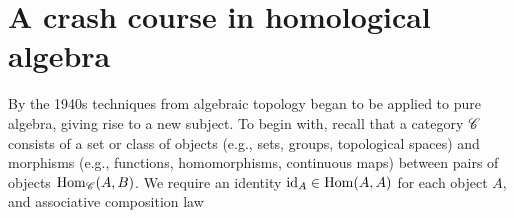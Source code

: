 \section{A crash course in homological algebra}
By the 1940s techniques from algebraic topology began to be applied to pure
algebra, giving rise to a new subject. To begin with, recall that a
category \(\mathscr{C}\) consists of a set or class of objects (e.g., sets,
groups, topological spaces) and morphisms (e.g., functions, homomorphisms,
continuous maps) between pairs of objects \(\operatorname{Hom}_{\mathscr{C}}(A,B)\). We require
an identity \(\operatorname{id}_A\in\operatorname{Hom}(A,A)\) for each object \(A\), and associative
composition law

